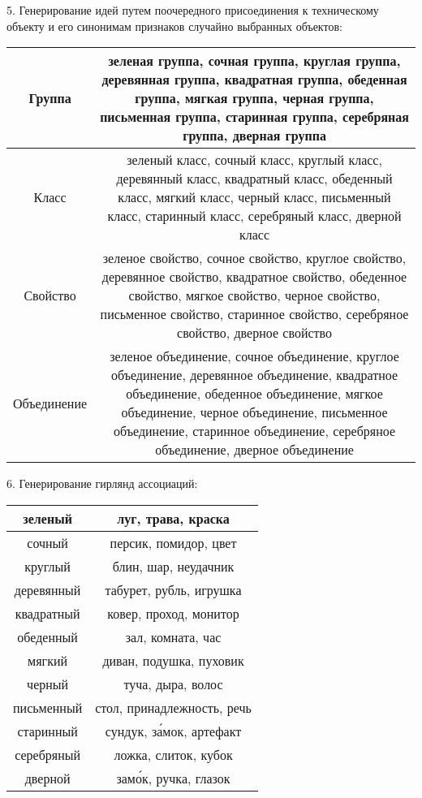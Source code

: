 5. Генерирование идей путем поочередного присоединения к техническому объекту и
его синонимам признаков случайно выбранных объектов:
\begin{table}[h!]
  \centering
  \small
  \begin{tabular}{|C{.1}|C{.8}|} \hline
    Группа & зеленая группа, сочная группа, круглая группа, деревянная группа,
      квадратная группа, обеденная группа, мягкая группа, черная группа,
      письменная группа, старинная группа, серебряная группа, дверная группа
      \\ \hline
    Класс & зеленый класс, сочный класс, круглый класс, деревянный класс,
      квадратный класс, обеденный класс, мягкий класс, черный класс,
      письменный класс, старинный класс, серебряный класс, дверной класс
      \\ \hline
    Свойство & зеленое свойство, сочное свойство, круглое свойство,
      деревянное свойство, квадратное свойство, обеденное свойство,
      мягкое свойство, черное свойство, письменное свойство,
      старинное свойство, серебряное свойство, дверное свойство
      \\ \hline
    Объедине\-ние & зеленое объединение, сочное объединение,
      круглое объединение, деревянное объединение, квадратное объединение,
      обеденное объединение, мягкое объединение, черное объединение,
      письменное объединение, старинное объединение, серебряное объединение,
      дверное объединение
      \\ \hline
    \end{tabular}
\end{table}

\newpage

6. Генерирование гирлянд ассоциаций:
\begin{table}[h!]
    \centering
    \small
    \begin{tabular}{|C{.15}|C{.6}|} \hline
        зеленый & луг, трава, краска \\ \hline
        сочный  & персик, помидор, цвет \\ \hline 
        круглый & блин, шар, неудачник \\ \hline
        деревянный & табурет, рубль, игрушка \\ \hline
        квадратный & ковер, проход, монитор \\ \hline
        обеденный & зал, комната, час \\ \hline
        мягкий & диван, подушка, пуховик \\ \hline
        черный & туча, дыра, волос \\ \hline
        письменный & стол, принадлежность, речь \\ \hline
        старинный & сундук, з\'{а}мок, артефакт \\ \hline
        серебряный & ложка, слиток, кубок \\ \hline
        дверной & зам\'{о}к, ручка, глазок \\ \hline
    \end{tabular}
\end{table}

